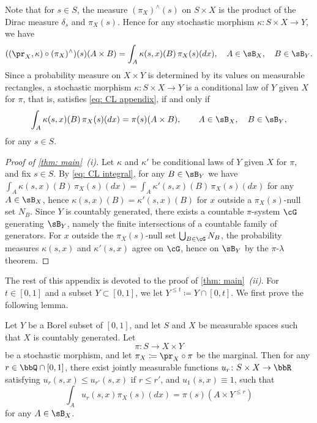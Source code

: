 \documentclass[12pt,reqno]{amsart}%
\theoremstyle{plain}
\theoremstyle{definition}
\def\R{\bbR}
\begin{document}
Note that for $s\in S$, the measure $(\pi_X)^\wedge(s)$ on $S\times X$ is the product of the Dirac measure $\delta_s$
and $\pi_X(s)$. Hence for any stochastic morphism $\kappa\colon S\times X\rightarrow Y$, we have
\begin{equation}\label{eq: CL rectangle}
	((\pr_X,\kappa)\circ(\pi_X)^\wedge)(s)(A\times B)=\int_A \kappa(s,x)(B)\,\pi_X(s)(dx),\quad A\in\sB_X,\quad B\in\sB_Y.
\end{equation}
Since a probability measure on $X\times Y$ is determined by its values on measurable rectangles,
a stochastic morphism $\kappa\colon S\times X\rightarrow Y$ is a conditional law of $Y$ given $X$ for $\pi$,
that is, satisfies \eqref{eq: CL appendix}, if and only if
\begin{equation}\label{eq: CL integral}
	\int_A \kappa(s,x)(B)\,\pi_X(s)(dx)=\pi(s)(A\times B),\qquad A\in\sB_X,\quad B\in\sB_Y,
\end{equation}
for any $s\in S$.

\begin{proof}[Proof of \cref{thm: main}~\textit{(i)}]
	Let $\kappa$ and $\kappa'$ be conditional laws of $Y$ given $X$ for $\pi$, and fix $s\in S$.
	By \eqref{eq: CL integral}, for any $B\in\sB_Y$ we have
	$\int_A \kappa(s,x)(B)\,\pi_X(s)(dx)=\int_A \kappa'(s,x)(B)\,\pi_X(s)(dx)$ for any $A\in\sB_X$,
	hence $\kappa(s,x)(B)=\kappa'(s,x)(B)$ for $x$ outside a $\pi_X(s)$-null set $N_B$.
	Since $Y$ is countably generated, there exists a countable $\pi$-system $\cG$ generating $\sB_Y$,
	namely the finite intersections of a countable family of generators.
	For $x$ outside the $\pi_X(s)$-null set $\bigcup_{B\in\cG}N_B$,
	the probability measures $\kappa(s,x)$ and $\kappa'(s,x)$ agree on $\cG$,
	hence on $\sB_Y$ by the $\pi$-$\lambda$ theorem.
\end{proof}

The rest of this appendix is devoted to the proof of \cref{thm: main}~\textit{(ii)}.
For $t\in[0,1]$ and a subset $Y\subset[0,1]$, we let $Y^{\leq t}\coloneqq Y\cap[0,t]$.
We first prove the following lemma.

\begin{lemma}\label{lem: construction}
	Let $Y$ be a Borel subset of $[0,1]$, and let $S$ and $X$ be measurable spaces
	such that $X$ is countably generated.  Let
	\[
		\pi\colon S\rightarrow X\times Y
	\]
	be a stochastic morphism, and let $\pi_X\coloneqq\pr_X\circ\pi$ be the marginal.
	Then for any $r\in \bbQ\cap[0,1]$, there exist jointly
	measurable functions $u_r\colon S\times X\rightarrow\R$
	satisfying $u_r(s,x)\leq u_{r'}(s,x)$ if $r\leq r'$, and $u_1(s,x)\equiv 1$,
	such that
	\[
		\int_A u_r(s,x) \pi_X(s)(dx)=\pi(s)(A\times Y^{\leq r})
	\]
	for any $A\in\sB_X$.
\end{lemma}
\end{document}
